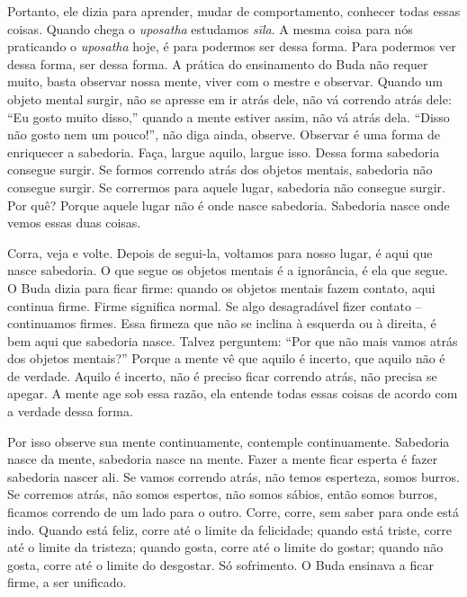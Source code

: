 Portanto, ele dizia para aprender, mudar de comportamento, conhecer
todas essas coisas. Quando chega o \textit{uposatha} estudamos
\textit{sīla}. A mesma coisa para nós praticando o \textit{uposatha}
hoje, é para podermos ser dessa forma. Para podermos ver dessa forma,
ser dessa forma. A prática do ensinamento do Buda não requer muito,
basta observar nossa mente, viver com o mestre e observar. Quando um
objeto mental surgir, não se apresse em ir atrás dele, não vá correndo
atrás dele: “Eu gosto muito disso,” quando a mente estiver assim, não
vá atrás dela. “Disso não gosto nem um pouco!”, não diga ainda,
observe. Observar é uma forma de enriquecer a sabedoria. Faça, largue
aquilo, largue isso. Dessa forma sabedoria consegue surgir. Se formos
correndo atrás dos objetos mentais, sabedoria não consegue surgir. Se
corrermos para aquele lugar, sabedoria não consegue surgir. Por quê?
Porque aquele lugar não é onde nasce sabedoria. Sabedoria nasce onde
vemos essas duas coisas. 

Corra, veja e volte. Depois de segui-la, voltamos para nosso lugar,
é aqui que nasce sabedoria. O que segue os objetos mentais é a
ignorância, é ela que segue. O Buda dizia para ficar firme: quando os
objetos mentais fazem contato, aqui continua firme. Firme significa
normal. Se algo desagradável fizer contato – continuamos firmes. Essa
firmeza que não se inclina à esquerda ou à direita, é bem aqui que
sabedoria nasce. Talvez perguntem: “Por que não mais vamos atrás dos
objetos mentais?” Porque a mente vê que aquilo é incerto, que aquilo
não é de verdade. Aquilo é incerto, não é preciso ficar correndo atrás,
não precisa se apegar. A mente age sob essa razão, ela entende todas
essas coisas de acordo com a verdade dessa forma. 

Por isso observe sua mente continuamente, contemple continuamente.
Sabedoria nasce da mente, sabedoria nasce na mente. Fazer a mente ficar
esperta é fazer sabedoria nascer ali. Se vamos correndo atrás, não
temos esperteza, somos burros. Se corremos atrás, não somos espertos,
não somos sábios, então somos burros, ficamos correndo de um lado para
o outro. Corre, corre, sem saber para onde está indo. Quando está
feliz, corre até o limite da felicidade; quando está triste, corre até
o limite da tristeza; quando gosta, corre até o limite do gostar;
quando não gosta, corre até o limite do desgostar. Só sofrimento. O
Buda ensinava a ficar firme, a ser unificado. 

